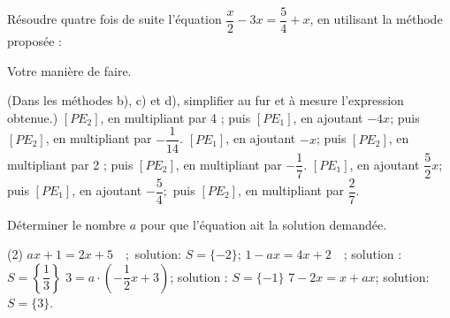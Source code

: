 \documentclass[a4paper,12pt]{report}
\begin{document}
\begin{acti}
Résoudre quatre fois de suite l'équation $\dfrac{x}{2}-3 x=\dfrac{5}{4}+x$, en utilisant la méthode proposée :
	\begin{tasks}
\task Votre manière de faire. 

(Dans les méthodes b), c) et d), simplifier au fur et à mesure l'expression obtenue.)
\task $\left[P E_2\right]$, en multipliant par 4 ; puis $\left[P E_1\right]$, en ajoutant $-4 x$; puis $\left[P E_2\right]$, en multipliant par $-\dfrac{1}{14}$.
\task $\left[P E_1\right]$, en ajoutant $-x$; puis $\left[P E_2\right]$, en multipliant par 2 ; puis $\left[P E_2\right]$, en multipliant par $-\dfrac{1}{7}$.
\task $\left[P E_1\right]$, en ajoutant $\dfrac{5}{2} x$; puis $\left[P E_1\right]$, en ajoutant $-\dfrac{5}{4} ;$ puis $\left[P E_2\right]$, en multipliant par $\dfrac{2}{7}$.
	\end{tasks}
\end{acti}
\begin{acti}
Déterminer le nombre $a$ pour que l'équation ait la solution demandée.
	\begin{tasks}(2)
\task $a x+1=2 x+5 \quad ;$ solution: $S=\{-2\}$;
\task $1-a x=4 x+2 \quad$; solution : $S=\left\{\dfrac{1}{3}\right\}$
\task $3=a \cdot\left(-\dfrac{1}{2} x+3\right)$; solution : $S=\{-1\}$
\task $7-2 x=x+a x$; solution: $S=\{3\}$.
	\end{tasks}
\end{acti}

\begin{comment}
89. Résoudre les équations de l'exercice 80 .
\end{comment}
\end{document}
